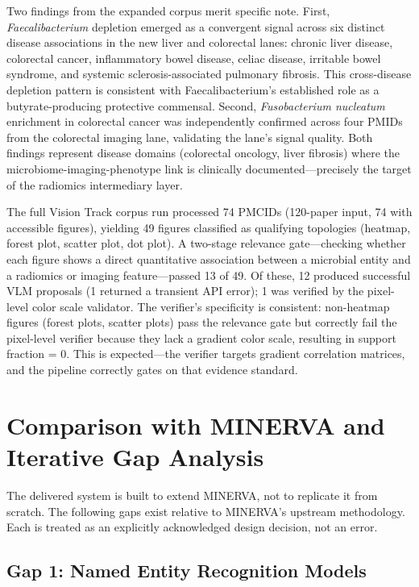 \documentclass[12pt, letterpaper]{article}
\begin{document}
Two findings from the expanded corpus merit specific note. First, \textit{Faecalibacterium} depletion emerged as a convergent signal across six distinct disease associations in the new liver and colorectal lanes: chronic liver disease, colorectal cancer, inflammatory bowel disease, celiac disease, irritable bowel syndrome, and systemic sclerosis-associated pulmonary fibrosis. This cross-disease depletion pattern is consistent with Faecalibacterium's established role as a butyrate-producing protective commensal. Second, \textit{Fusobacterium nucleatum} enrichment in colorectal cancer was independently confirmed across four PMIDs from the colorectal imaging lane, validating the lane's signal quality. Both findings represent disease domains (colorectal oncology, liver fibrosis) where the microbiome-imaging-phenotype link is clinically documented---precisely the target of the radiomics intermediary layer.

The full Vision Track corpus run processed 74 PMCIDs (120-paper input, 74 with accessible figures), yielding 49 figures classified as qualifying topologies (heatmap, forest plot, scatter plot, dot plot). A two-stage relevance gate—checking whether each figure shows a direct quantitative association between a microbial entity and a radiomics or imaging feature—passed 13 of 49. Of these, 12 produced successful VLM proposals (1 returned a transient API error); 1 was verified by the pixel-level color scale validator. The verifier's specificity is consistent: non-heatmap figures (forest plots, scatter plots) pass the relevance gate but correctly fail the pixel-level verifier because they lack a gradient color scale, resulting in support fraction = 0. This is expected—the verifier targets gradient correlation matrices, and the pipeline correctly gates on that evidence standard.

\section{Comparison with MINERVA and Iterative Gap Analysis}

The delivered system is built to extend MINERVA, not to replicate it from scratch. The following gaps exist relative to MINERVA's upstream methodology. Each is treated as an explicitly acknowledged design decision, not an error.

\subsection{Gap 1: Named Entity Recognition Models}
\end{document}

